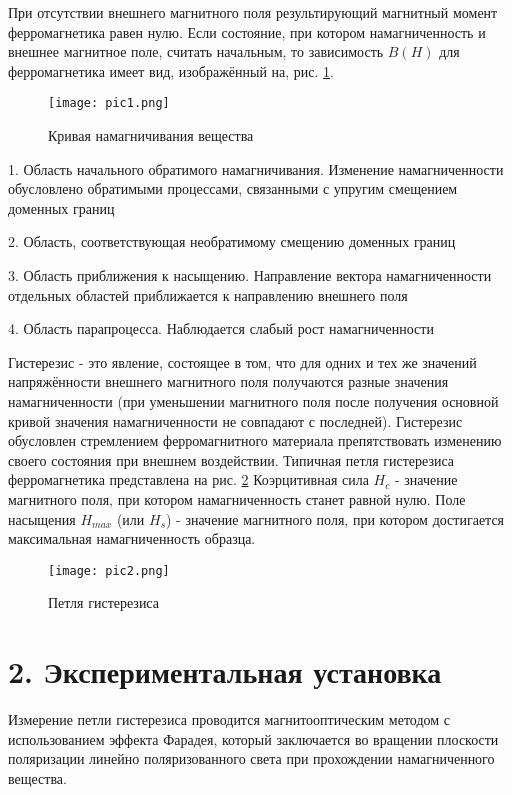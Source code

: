 \documentclass[a4paper,12pt]{report}
\begin{document}
При отсутствии внешнего магнитного поля результирующий магнитный момент ферромагнетика равен нулю. Если состояние, при котором намагниченность и внешнее магнитное поле, считать начальным, то зависимость $B(H)$ для ферромагнетика имеет вид, изображённый на, рис. \ref{I}.

\begin{figure}[H]
    \centering
    \texttt{[image: pic1.png]}
    \caption{Кривая намагничивания вещества} \label{I}
\end{figure}

1. Область начального обратимого намагничивания. Изменение намагниченности обусловлено обратимыми процессами, связанными с упругим смещением доменных границ

2. Область, соответствующая необратимому смещению доменных границ

3. Область приближения к насыщению. Направление вектора намагниченности отдельных областей приближается к направлению внешнего поля

4. Область парапроцесса. Наблюдается слабый рост намагниченности

$\textbf{Гистерезис}$ - это явление, состоящее в том, что для одних и тех же значений напряжённости внешнего магнитного поля получаются разные значения намагниченности (при уменьшении магнитного поля после получения основной кривой значения намагниченности не совпадают с последней). Гистерезис обусловлен стремлением ферромагнитного материала препятствовать изменению своего состояния при внешнем воздействии. Типичная петля гистерезиса ферромагнетика представлена на рис. \ref{hysteresis} $\textbf{Коэрцитивная сила}$ $H_{c}$ - значение магнитного поля, при котором намагниченность станет равной нулю. Поле насыщения $H_{max}$ (или $H_{s}$) - значение магнитного поля, при котором достигается максимальная намагниченность образца.

\begin{figure}[H]
    \centering
    \texttt{[image: pic2.png]}
    \caption{Петля гистерезиса} \label{hysteresis}
\end{figure}

\section*{2. Экспериментальная установка}
Измерение петли гистерезиса проводится магнитооптическим методом с использованием эффекта Фарадея, который заключается во вращении плоскости поляризации линейно поляризованного света при прохождении намагниченного вещества.
\end{document}
